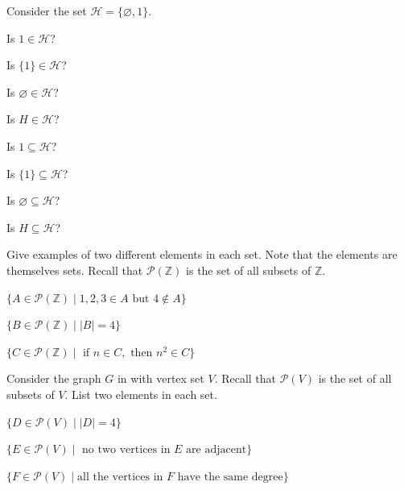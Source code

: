 \begin{exer}[\exerU] %
\label{exer_set_containing_element_phi}
    Consider the set $\mathscr{H} = \{ \varnothing, 1\}$.
        \begin{exerpart}
            \item Is $1 \in \mathscr{H}$?
            \item Is $\{1\} \in \mathscr{H}$?
            \item Is $\varnothing \in \mathscr{H}$?
            \item Is $H \in \mathscr{H}$?
            \item Is $1 \subseteq \mathscr{H}$?
            \item Is $\{1\} \subseteq \mathscr{H}$?
            \item Is $\varnothing \subseteq \mathscr{H}$?
            \item Is $H \subseteq \mathscr{H}$?
        \end{exerpart}
\end{exer} 

\begin{exer}[\exerU] %
\label{exer_set_of_sets_setbuilder}
    Give examples of two different elements in each set. Note that the elements are themselves sets.  Recall that $\mathscr{P}(\mathbb{Z})$ is the set of all subsets of $\mathbb{Z}$.
        \begin{exerpart}
            \item $\{ A \in \mathscr{P}(\mathbb{Z}) \mid 1, 2, 3 \in A \text{ but } 4 \notin A\}$
            \item $\{ B \in \mathscr{P}(\mathbb{Z}) \mid |B| = 4\}$
            \item $\{C \in \mathscr{P}(\mathbb{Z}) \mid \text{ if }n \in C, \text{ then } n^2 \in C\}$
        \end{exerpart}
\end{exer}

\begin{exer}[\exerU] %
\label{exer_set_of_sets_graph}
    Consider the graph $G$ in  with vertex set $V$. Recall that $\mathscr{P}(V)$ is the set of all subsets of $V$.  List two elements in each set. 
        \begin{exerpart}
            \item $\{ D \in \mathscr{P}(V) \mid |D| = 4\}$
            \item $\{ E \in \mathscr{P}(V)  \mid \text{ no two vertices in }E\text{ are adjacent}\}$
            \item $\{ F \in \mathscr{P}(V)  \mid \text{all the vertices in }F\text{ have the same degree} \}$ 
        \end{exerpart}
\end{exer}

